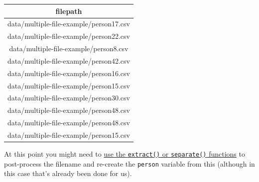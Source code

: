 \documentclass[]{article}
\begin{document}
\begin{longtable}[]{@{}c@{}}
\toprule
\begin{minipage}[b]{0.57\columnwidth}\centering
filepath\strut
\end{minipage}\tabularnewline
\midrule
\endhead
\begin{minipage}[t]{0.57\columnwidth}\centering
data/multiple-file-example/person17.csv\strut
\end{minipage}\tabularnewline
\begin{minipage}[t]{0.57\columnwidth}\centering
data/multiple-file-example/person22.csv\strut
\end{minipage}\tabularnewline
\begin{minipage}[t]{0.57\columnwidth}\centering
data/multiple-file-example/person8.csv\strut
\end{minipage}\tabularnewline
\begin{minipage}[t]{0.57\columnwidth}\centering
data/multiple-file-example/person42.csv\strut
\end{minipage}\tabularnewline
\begin{minipage}[t]{0.57\columnwidth}\centering
data/multiple-file-example/person16.csv\strut
\end{minipage}\tabularnewline
\begin{minipage}[t]{0.57\columnwidth}\centering
data/multiple-file-example/person15.csv\strut
\end{minipage}\tabularnewline
\begin{minipage}[t]{0.57\columnwidth}\centering
data/multiple-file-example/person30.csv\strut
\end{minipage}\tabularnewline
\begin{minipage}[t]{0.57\columnwidth}\centering
data/multiple-file-example/person48.csv\strut
\end{minipage}\tabularnewline
\begin{minipage}[t]{0.57\columnwidth}\centering
data/multiple-file-example/person48.csv\strut
\end{minipage}\tabularnewline
\begin{minipage}[t]{0.57\columnwidth}\centering
data/multiple-file-example/person15.csv\strut
\end{minipage}\tabularnewline
\bottomrule
\end{longtable}

At this point you might need to
\protect\hyperlink{extract-to-split-column-names}{use the \texttt{extract()} or \texttt{separate()} functions}
to post-process the filename and re-create the \texttt{person} variable from this
(although in this case that's already been done for us).
\end{document}
